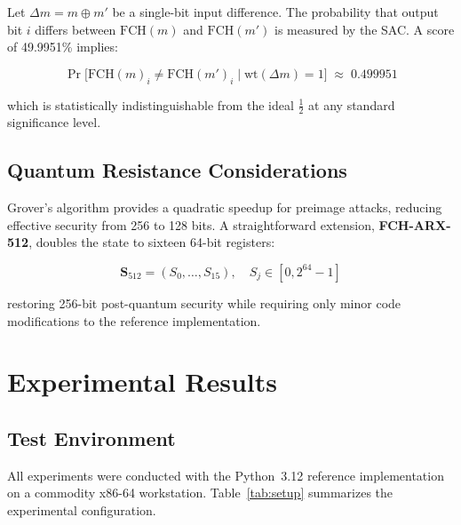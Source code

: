 \documentclass[12pt,journal]{IEEEtran}
\begin{document}
Let $\Delta m = m \oplus m'$ be a single-bit input difference. The probability
that output bit $i$ differs between $\mathrm{FCH}(m)$ and $\mathrm{FCH}(m')$
is measured by the SAC. A score of 49.9951\% implies:

\begin{equation}
  \Pr\!\bigl[\mathrm{FCH}(m)_i \neq \mathrm{FCH}(m')_i \mid
             \mathrm{wt}(\Delta m)=1\bigr]
  \;\approx\; 0.499951
  \label{eq:sac_prob}
\end{equation}

which is statistically indistinguishable from the ideal $\frac{1}{2}$
at any standard significance level.

\subsection{Quantum Resistance Considerations}

Grover's algorithm \cite{grover1996} provides a quadratic speedup for preimage
attacks, reducing effective security from 256 to 128 bits. A straightforward
extension, \textbf{FCH-ARX-512}, doubles the state to sixteen 64-bit registers:

\begin{equation}
  \mathbf{S}_{512} = (S_0, \ldots, S_{15}),\quad
  S_j \in [0, 2^{64}-1]
  \label{eq:v512}
\end{equation}

restoring 256-bit post-quantum security while requiring only minor code
modifications to the reference implementation.

\section{Experimental Results}

\subsection{Test Environment}

All experiments were conducted with the Python~3.12 reference implementation
on a commodity x86-64 workstation. Table~\ref{tab:setup} summarizes the
experimental configuration.
\end{document}

